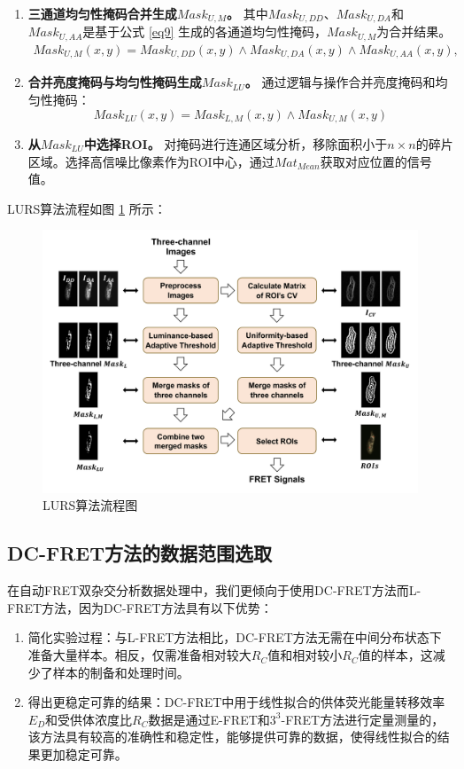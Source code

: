 \begin{enumerate}
\item \textbf{三通道均匀性掩码合并生成${Mask}_{U,M}$。}  
其中${Mask}_{U,DD}$、${Mask}_{U,DA}$和${Mask}_{U,AA}$是基于公式 \ref{eq9} 生成的各通道均匀性掩码，${Mask}_{U,M}$为合并结果。
\begin{equation}
    \begin{split}
    {Mask}_{U,M}(x,y)={Mask}_{U,DD}(x,y) \land {Mask}_{U,DA}(x,y) \land {Mask}_{U,AA}(x,y),
    \end{split}
    \label{eq_merge_u}
\end{equation}
\item \textbf{合并亮度掩码与均匀性掩码生成${Mask}_{LU}$。}  
通过逻辑与操作合并亮度掩码和均匀性掩码：
\begin{equation}
    {Mask}_{LU}(x,y)={Mask}_{L,M}(x,y) \land {Mask}_{U,M}(x,y)
    \label{eq10}
\end{equation}
\item \textbf{从${Mask}_{LU}$中选择ROI。}  
对掩码进行连通区域分析，移除面积小于$n \times n$的碎片区域。选择高信噪比像素作为ROI中心，通过${Mat}_{Mean}$获取对应位置的信号值。
\end{enumerate}

LURS算法流程如图 \ref{fig1} 所示：
\begin{figure}[!htbp]
\centering
\includegraphics[width=1\linewidth]{../figures/3/3_LURS流程图.png}
\caption{LURS算法流程图}\label{fig1}
\end{figure}

\subsection{DC-FRET方法的数据范围选取}
\ifshowtext
在自动FRET双杂交分析数据处理中，我们更倾向于使用DC-FRET方法而L-FRET方法，因为DC-FRET方法具有以下优势：
\begin{enumerate}
    \item 简化实验过程：与L-FRET方法相比，DC-FRET方法无需在中间分布状态下准备大量样本。相反，仅需准备相对较大$R_C$值和相对较小$R_C$值的样本，这减少了样本的制备和处理时间。
    \item 得出更稳定可靠的结果：DC-FRET中用于线性拟合的供体荧光能量转移效率$E_D$和受供体浓度比$R_C$数据是通过E-FRET和$3^3$-FRET方法进行定量测量的，该方法具有较高的准确性和稳定性，能够提供可靠的数据，使得线性拟合的结果更加稳定可靠。
\end{enumerate}

